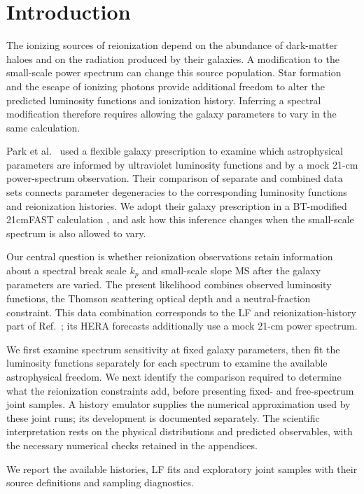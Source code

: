 \section{Introduction}\label{introduction}

The ionizing sources of reionization depend on the abundance of dark-matter haloes and on the radiation produced by their galaxies. A modification to the small-scale power spectrum can change this source population. Star formation and the escape of ionizing photons provide additional freedom to alter the predicted luminosity functions and ionization history. Inferring a spectral modification therefore requires allowing the galaxy parameters to vary in the same calculation.

Park et al.~\cite{Park2019} used a flexible galaxy prescription to examine which astrophysical parameters are informed by ultraviolet luminosity functions and by a mock 21-cm power-spectrum observation. Their comparison of separate and combined data sets connects parameter degeneracies to the corresponding luminosity functions and reionization histories. We adopt their galaxy prescription in a BT-modified 21cmFAST calculation \cite{Mesinger2011,Murray2020}, and ask how this inference changes when the small-scale spectrum is also allowed to vary.

Our central question is whether reionization observations retain information about a spectral break scale $k_p$ and small-scale slope MS after the galaxy parameters are varied. The present likelihood combines observed luminosity functions, the Thomson scattering optical depth and a neutral-fraction constraint. This data combination corresponds to the LF and reionization-history part of Ref.~\cite{Park2019}; its HERA forecasts additionally use a mock 21-cm power spectrum.

We first examine spectrum sensitivity at fixed galaxy parameters, then fit the luminosity functions separately for each spectrum to examine the available astrophysical freedom. We next identify the comparison required to determine what the reionization constraints add, before presenting fixed- and free-spectrum joint samples. A history emulator supplies the numerical approximation used by these joint runs; its development is documented separately. The scientific interpretation rests on the physical distributions and predicted observables, with the necessary numerical checks retained in the appendices.

We report the available histories, LF fits and exploratory joint samples with their source definitions and sampling diagnostics.


